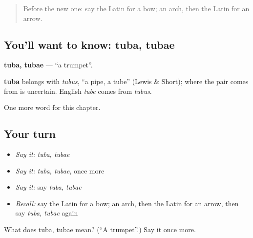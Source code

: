 \begin{quote}
Before the new one: say the Latin for a bow; an arch, then the Latin for an arrow.
\end{quote}

\subsection*{You'll want to know: tuba, tubae}
\textbf{tuba, tubae} — \textquotedblleft{}a trumpet\textquotedblright{}.

\begin{cousinweb}
\textbf{tuba} belongs with \emph{tubus}, \textquotedblleft{}a pipe, a tube\textquotedblright{} (Lewis \& Short); where the pair comes from is uncertain. English \emph{tube} comes from \emph{tubus}.
\end{cousinweb}

\begin{grammarlens}[title={What you've built}]
One more word for this chapter.
\end{grammarlens}

\subsection*{Your turn}
\begin{itemize}
\raggedright
  \item \emph{Say it:} \emph{tuba, tubae}
  \item \emph{Say it:} \emph{tuba, tubae}, once more
  \item \emph{Say it:} say \emph{tuba, tubae}
  \item \emph{Recall:} say the Latin for a bow; an arch, then the Latin for an arrow, then say \emph{tuba, tubae} again
\end{itemize}

\begin{tcolorbox}[breakable,colback=teal!4,colframe=teal!35!black,title={Before you move on}]
What does tuba, tubae mean? (\textquotedblleft{}A trumpet\textquotedblright{}.) Say it once more.
\end{tcolorbox}
